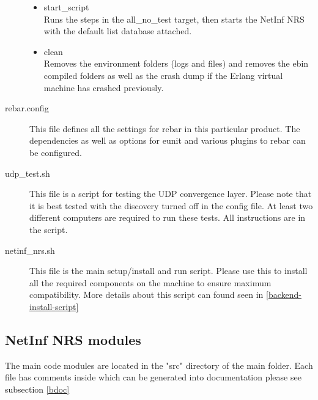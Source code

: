 \begin{description}
\begin{itemize}
\item start\_script \\
Runs the steps in the all\_no\_test target, then starts the NetInf NRS with the default list database attached.
\item clean \\
Removes the environment folders (logs and files) and removes the ebin compiled folders as well as the crash dump if the Erlang virtual 
machine has crashed previously.
\end{itemize}
\item[rebar.config]
This file defines all the settings for rebar in this particular product. The dependencies as well as options for eunit and various 
plugins to rebar can be configured.
\item[udp\_test.sh]
This file is a script for testing the UDP convergence layer. Please note that it is best tested with the discovery turned off in the config file. 
At least two different computers are required to run these tests. All instructions are in the script. 
\item[netinf\_nrs.sh]
This file is the main setup/install and run script. Please use this to install all the required components on the machine to ensure 
maximum compatibility. More details about this script can found seen in \ref{backend-install-script}
\end{description}

\subsection {NetInf NRS modules}

The main code modules are located in the "src" directory of the main folder. Each file has comments inside which can be generated into 
documentation please see subsection \ref{bdoc}

